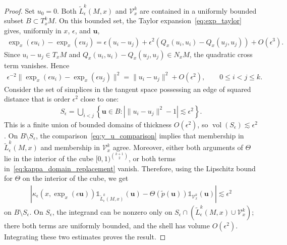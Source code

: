 \documentclass[11pt,reqno]{amsproc}
\numberwithin{equation}{section}
\newcommand{\one}{\mathbb{1}}
\newcommand{\bu}{\mathbf{u}}
\newcommand{\cV}{\mathcal{V}}
\newcommand{\tp}{\tilde{p}}
\newcommand{\tL}{\widetilde{L}}
\newcommand{\ls}{\lesssim}
\newcommand{\vol}{\operatorname{vol}}
\theoremstyle{definition}
\theoremstyle{plain}
\begin{document}
    \begin{proof}
        Set $u_0=0$. Both $\tL^k_\epsilon(M,x)$ and $\cV_x^k$ are contained in a uniformly bounded subset $B\subset T_x^kM$. On this bounded set, the Taylor expansion~\eqref{eq:exp_taylor} gives, uniformly in $x$, $\epsilon$, and $\bu$,
        \begin{align} 
            \exp_x(\epsilon u_i)-\exp_x(\epsilon u_j)=\epsilon(u_i-u_j)+\epsilon^2(Q_x(u_i,u_i)-Q_x(u_j,u_j))+O(\epsilon^3).
        \end{align}
        Since $u_i-u_j\in T_xM$ and $Q_x(u_i,u_i)-Q_x(u_j,u_j)\in N_xM$, the quadratic cross term vanishes. Hence
        \begin{align} \label{eq:y_u_comparison}
            \epsilon^{-2}\|\exp_x(\epsilon u_i)-\exp_x(\epsilon u_j)\|^2=\|u_i-u_j\|^2+O(\epsilon^2), \qquad 0\leq i<j\leq k.
        \end{align}
        Consider the set of simplices in the tangent space possessing an edge of squared distance that is order $\epsilon^2$ close to one:
        \begin{align}
            S_\epsilon=\bigcup_{i<j}\left\{\bu\in B:\left|\|u_i-u_j\|^2-1\right|\ls \epsilon^2\right\}.
        \end{align}
        This is a finite union of bounded domains of thickness $O(\epsilon^2)$, so $\vol(S_\epsilon)\ls \epsilon^2$.
        On $B\setminus S_\epsilon$, the comparison~\eqref{eq:y_u_comparison} implies that membership in $\tL^k_\epsilon(M,x)$ and membership in $\cV_x^k$ agree. Moreover, either both arguments of $\Theta$ lie in the interior of the cube $[0,1)^{\binom{k+1}{2}}$, or both terms in~\eqref{eq:kappa_domain_replacement} vanish. Therefore, using the Lipschitz bound for $\Theta$ on the interior of the cube, we get
        \begin{align}
            \left|\kappa_\epsilon(x,\exp_x(\epsilon\bu))\one_{\tL^k_\epsilon(M,x)}(\bu)-\Theta(\tp(\bu))\one_{\cV_x^k}(\bu)\right|\ls\epsilon^2
        \end{align}
        on $B\setminus S_\epsilon$. On $S_\epsilon$, the integrand can be nonzero only on $S_\epsilon\cap(\tL^k_\epsilon(M,x)\cup\cV_x^k)$; there both terms are uniformly bounded, and the shell has volume $O(\epsilon^2)$. Integrating these two estimates proves the result.
    \end{proof}
\end{document}
